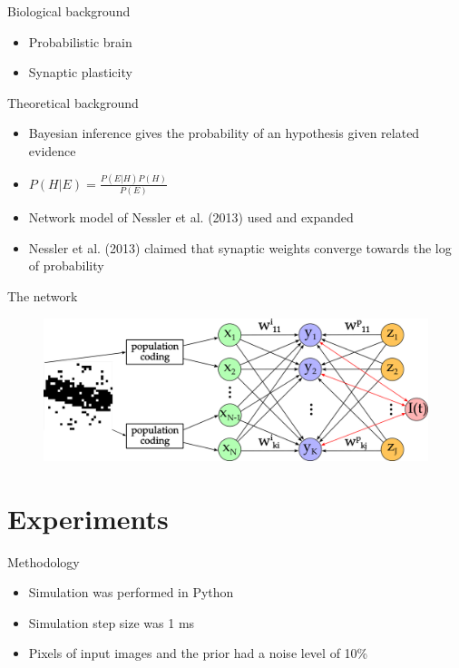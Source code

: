 \documentclass[aspectratio=169]{beamer}
\begin{document}
\begin{frame}{Biological background}
      \begin{itemize}
        \item Probabilistic brain
        \item Synaptic plasticity
      \end{itemize}
\end{frame}

\begin{frame}{Theoretical background}
      \begin{itemize}
        \item Bayesian inference gives the probability of an hypothesis given related evidence
        \item $P(H|E) = \frac{P(E|H) P(H)}{P(E)}$
        \item Network model of Nessler et al. (2013) used and expanded
        \item Nessler et al. (2013) claimed that synaptic weights converge towards the log of probability
        \end{itemize}
\end{frame}

\begin{frame}{The network}
        \begin{figure}
        \includegraphics[width=0.80\linewidth]{../Latex/figures/networkPlan.png}
      \end{figure} 
\end{frame}


\section{Experiments}

\begin{frame}{Methodology}
\begin{itemize}
	\item Simulation was performed in Python
	\item Simulation step size was 1 ms
	\item Pixels of input images and the prior had a noise level of 10\%
\end{itemize}
\end{frame}
\end{document}

